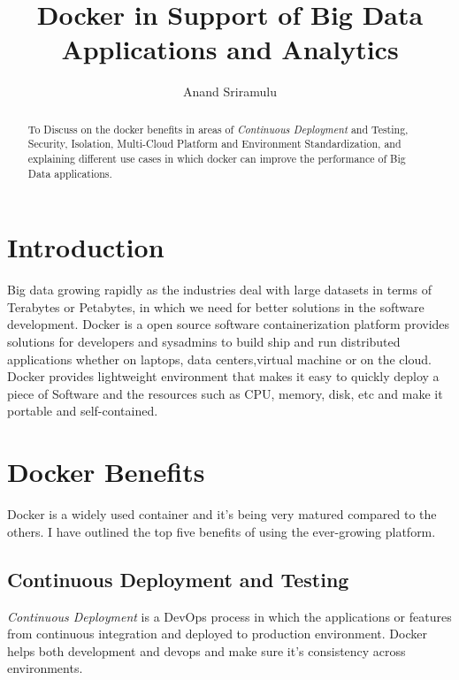 \documentclass[sigconf]{acmart}
\begin{document}
	\title {Docker in Support of Big Data Applications and Analytics}
	
	
	\author{Anand Sriramulu}
	
	
	\renewcommand{\shortauthors}{Anand S}
	
	
	\begin{abstract}
		To Discuss on the docker benefits in areas of \textit{Continuous Deployment} and Testing, Security, Isolation, Multi-Cloud Platform and Environment Standardization, and explaining different use cases in which docker can improve the performance of Big Data applications.
	\end{abstract}
	
	
	\maketitle
	
	\section{Introduction}
	Big data growing rapidly as the industries deal with large datasets in terms of Terabytes or Petabytes, in which we need for better solutions in the software development. 	
	Docker is a open source software containerization platform provides solutions for developers and sysadmins to build ship and run distributed applications whether on laptops, data centers,virtual machine or on the cloud.
	Docker provides lightweight environment that makes it easy to quickly deploy a piece of Software and the resources such as CPU, memory, disk, etc and make it portable and self-contained. \cite{WhatDocker}

	\section{Docker Benefits}
	Docker is a widely used container and it's being very matured compared to the others. I have outlined the top five benefits of using the ever-growing platform. \cite{DockerBenefits}
	\subsection{Continuous Deployment and Testing}
	\textit{Continuous Deployment} is a DevOps process in which the applications or features from continuous integration and deployed to production environment.
	Docker helps both development and devops and make sure it's consistency across environments. 
	
\end{document}
